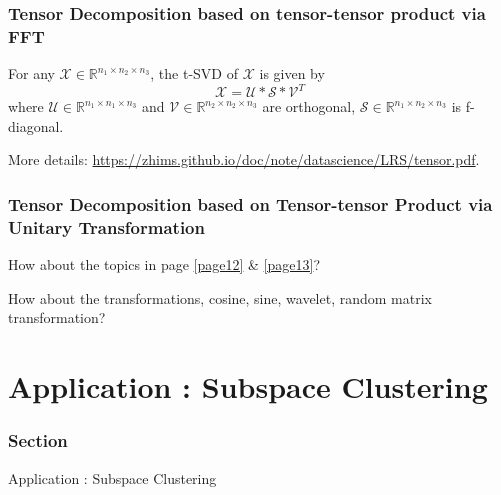 \documentclass[aspectratio=2516]{beamer}
\begin{document}
\begin{frame}
\frametitle{\small Tensor Decomposition based on tensor-tensor product via FFT}

\begin{theorem}
	For any $ \mathcal{\mathcal{X}} \in \mathbb{R}^{n_{1} \times n_{2} \times n_{3}}$, the t-SVD of $ \mathcal{\mathcal{X}} $ is given by
	\begin{equation}
	\mathcal{\mathcal{X}} = \mathcal{U} * \mathcal{S} * \mathcal{V}^{T}
	\label{eq.1.17}
	\end{equation}
	where $ \mathcal{U} \in \mathbb{R}^{n_{1} \times n_{1} \times n_{3}} $ and $ \mathcal{V} \in \mathbb{R}^{n_{2} \times n_{2} \times n_{3}} $ are orthogonal, $ \mathcal{S} \in \mathbb{R}^{n_{1}\times n_{2} \times n_{3}} $ is f-diagonal.
\end{theorem}

\vspace{0.5cm}

{\tiny More details:} {\color{blue} \tiny \url{https://zhims.github.io/doc/note/datascience/LRS/tensor.pdf}}.

\end{frame}


\begin{frame}
\frametitle{\small Tensor Decomposition based on Tensor-tensor Product via Unitary Transformation}

How about the topics in page {\color{blue} \ref{page12}} \& {\color{blue} \ref{page13}}?

\vspace{1cm}

How about the transformations, cosine, sine, wavelet, random matrix transformation? 

\end{frame}


\section{Application \uppercase\expandafter{}: Subspace Clustering}



\begin{frame}
\frametitle{ Section \uppercase\expandafter{}}


\begin{center}
	\Large Application \uppercase\expandafter{}: Subspace Clustering 
\end{center}

\end{frame}
\end{document}
